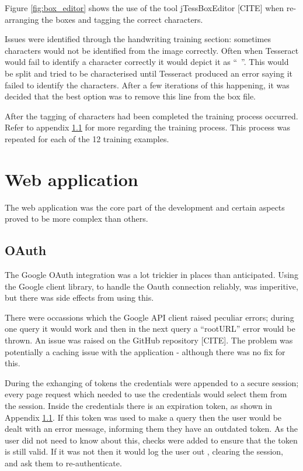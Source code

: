 Figure \ref{fig:box_editor} shows the use of the tool jTessBoxEditor [CITE] when re-arranging the boxes and tagging the correct characters.

Issues were identified through the handwriting training section: sometimes characters would not be identified from the image correctly. Often when Tesseract would fail to identify a character correctly it would depict it as ``~''. This would be split and tried to be characterised until Tesseract produced an error saying it failed to identify the characters. After a few iterations of this happening, it was decided that the best option was to remove this line from the box file.

After the tagging of characters had been completed the training process occurred. Refer to appendix \ref{} for more regarding the training process. This process was repeated for each of the 12 training examples.

\section{Web application}
The web application was the core part of the development and certain aspects proved to be more complex than others.
\subsection{OAuth}
The Google OAuth integration was a lot trickier in places than anticipated. Using the Google client library, to handle the Oauth connection reliably, was imperitive, but there was side effects from using this.

There were occassions which the Google API client raised peculiar errors; during one query it would work and then in the next query a ``rootURL'' error would be thrown. An issue was raised on the GitHub repository [CITE]. The problem was potentially a caching issue with the application - although there was no fix for this.

During the exhanging of tokens the credentials were appended to a secure session; every page request which needed to use the credentials would select them from the session. Inside the credentials there is an expiration token, as shown in Appendix \ref{}. If this token was used to make a query then the user would be dealt with an error message, informing them they have an outdated token. As the user did not need to know about this, checks were added to ensure that the token is still valid. If it was not then it would log the user out , clearing the session, and ask them to re-authenticate.

